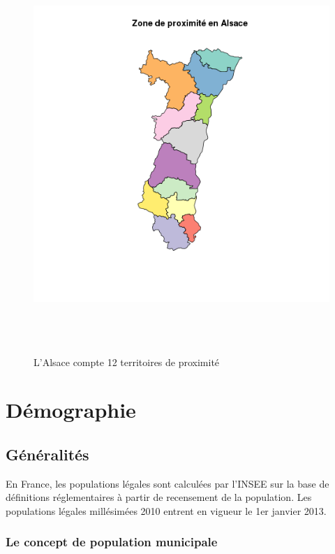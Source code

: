 \documentclass[12pt,english,french,twoside]{report}\usepackage[]{graphicx}\usepackage[]{color}
\begin{document}
\begin{figure}[ht]
 \centering
 \includegraphics[height=15cm,keepaspectratio=true]{../figure/zone_proximite.png}
 \caption{L'Alsace compte 12 territoires de proximité}
 \label{fig:zp}
\end{figure}

\section{Démographie}
\subsection{Généralités}

En France, les populations légales sont calculées par l'INSEE sur la base de définitions réglementaires à partir de recensement de la population. 
Les populations légales millésimées 2010 entrent en vigueur le 1er janvier 2013.  

\subsubsection{Le concept de population municipale}
\end{document}
